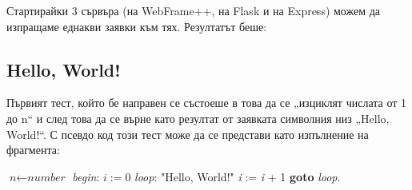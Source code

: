 \documentclass[documentation.tex]{subfiles}
\begin{document}
Стартирайки 3 сървъра (на WebFrame++, на Flask и на Express) можем да изпращаме еднакви заявки към тях. Резултатът беше:

\subsection{Hello, World!}
    Първият тест, който бе направен се състоеше в това да се „изциклят числата от 1 до n“ и след това да се върне като резултат от заявката символния низ „Hello, World!“. С псевдо код този тест може да се представи като изпълнение на фрагмента:
    
    \begin{algorithm}
    \caption{}\label{test1}
        \begin{algorithmic}[1]
            \State $\textit{n} \gets \textit{number}$
            \BState \emph{begin}:
            \State $\textit{i} := 0$
            \BState \emph{loop}:
                \Return "Hello, World!"
            \EndIf
                \State \textit{i} := \textit{i} + 1
                \State \textbf{goto} \emph{loop}.
            \EndIf
            \EndProcedure
        \end{algorithmic}
    \end{algorithm}
    \newpage
\end{document}
